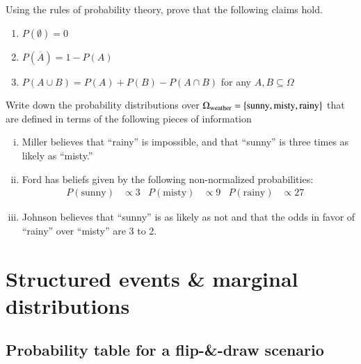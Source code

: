 \documentclass[nobib,nofonts]{tufte-handout}
\begin{document}
\bigskip
\noindent \colorbox{mygray}{\centering
  \begin{minipage}{1.0\textwidth}

    \begin{exercise}
      Using the rules of probability theory, prove that the following claims hold.
      \begin{enumerate}[{C}1.]
        \item $P(\emptyset) = 0$
        \item $P(\overline{A}) = 1 - P(A)$
        \item $P(A \cup B) = P(A) + P(B) - P(A \cap B)$ for any $A, B \subseteq \Omega$
      \end{enumerate}
    \end{exercise}

    \begin{exercise}
      Write down the probability distributions over $\Omega_{\text{weather}} = \left\{\text{sunny}, \text{misty}, \text{rainy}\right\}$ that are defined in terms of the following pieces of information
      \begin{enumerate}[(i)]
        \item Miller believes that ``rainy'' is impossible, and that ``sunny'' is three times as likely as ``misty.''
        \item Ford has beliefs given by the following non-normalized probabilities:
        \begin{align*}
          P(\text{sunny})   & \propto 3
          & P(\text{misty}) & \propto 9
          & P(\text{rainy}) & \propto 27 &
        \end{align*}
        \item Johnson believes that ``sunny'' is as likely as not and that the odds in favor of ``rainy'' over ``misty'' are 3 to 2.
      \end{enumerate}

    \end{exercise}

  \end{minipage}
}

\newpage

\section{Structured events \& marginal distributions}

\subsection{Probability table for a flip-\&-draw scenario}
\end{document}
